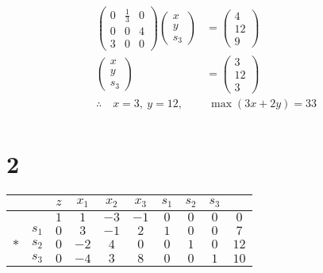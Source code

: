 \documentclass[a4paper,12pt]{article}
\begin{document}
\begin{align*}
    \begin{pmatrix}0 & \frac{1}{3} & 0 \\ 0 & 0 & 4 \\ 3 & 0 & 0\end{pmatrix} \begin{pmatrix}x \\ y \\ s_3\end{pmatrix} & = \begin{pmatrix}4 \\ 12 \\ 9\end{pmatrix} \\
    \begin{pmatrix}x \\y \\ s_3\end{pmatrix}                                                                            & = \begin{pmatrix}3 \\ 12 \\ 3\end{pmatrix} \\
    \therefore \quad x = 3, \ y = 12,                                                                                   & \ \max{(3 x + 2 y)} = 33                   \\
\end{align*}

\section*{2}
\begin{table}[H]
    \tiny
    \begin{tabularx}{\textwidth}{cc|ccccccc|c}
            &       & $z$ & $x_1$ & $x_2$ & $x_3$ & $s_1$ & $s_2$ & $s_3$ &      \\
        \hline
            &       & $1$ & $1$   & $-3$  & $-1$  & $0$   & $0$   & $0$   & $0$  \\
        \hline
            & $s_1$ & $0$ & $3$   & $-1$  & $2$   & $1$   & $0$   & $0$   & $7$  \\
        $*$ & $s_2$ & $0$ & $-2$  & $4$   & $0$   & $0$   & $1$   & $0$   & $12$ \\
            & $s_3$ & $0$ & $-4$  & $3$   & $8$   & $0$   & $0$   & $1$   & $10$ \\
    \end{tabularx}
\end{table}
\end{document}
